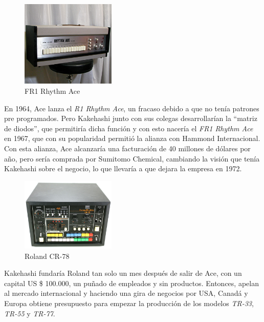 \documentclass{article}
\begin{document}
\begingroup
\setlength{\intextsep}{0pt}%
\setlength{\columnsep}{0pt}%

\begin{figure}
    \centering
    \includegraphics[width=0.4\textwidth]{images/fr1.jpg}
    \vspace{-5pt}
    \caption{FR1 Rhythm Ace}
\end{figure}

En 1964, Ace lanza el \emph{R1 Rhythm Ace}, un fracaso debido a que no tenía patrones pre programados. Pero Kakehashi junto con sus colegas desarrollarían la “matriz de diodos”, que permitiría dicha función y con esto nacería el \emph{FR1 Rhythm Ace} en 1967, que con su popularidad permitió la alianza con Hammond Internacional. Con esta alianza, Ace alcanzaría una facturación de 40 millones de dólares por año, pero sería comprada por Sumitomo Chemical, cambiando la visión que tenía Kakehashi sobre el negocio, lo que llevaría a que dejara la empresa en 1972.\cite{rolandstory}\cite{drumbook}\\

\endgroup

\begingroup
\setlength{\intextsep}{0pt}%
\setlength{\columnsep}{0pt}%

\begin{figure}
    \centering
    \includegraphics[width=0.4\textwidth]{images/cr78.jpg}
    \vspace{-5pt}
    \caption{Roland CR-78}
\end{figure}

Kakehashi fundaría Roland tan solo un mes después de salir de Ace, con un capital US \$ 100.000, un puñado de empleados y sin productos. Entonces, apelan al mercado internacional y haciendo una gira de negocios por USA, Canadá y Europa obtiene presupuesto para empezar la producción de los modelos \emph{TR-33}, \emph{TR-55} y \emph{TR-77}.\cite{rolandstory}\\
\end{document}
